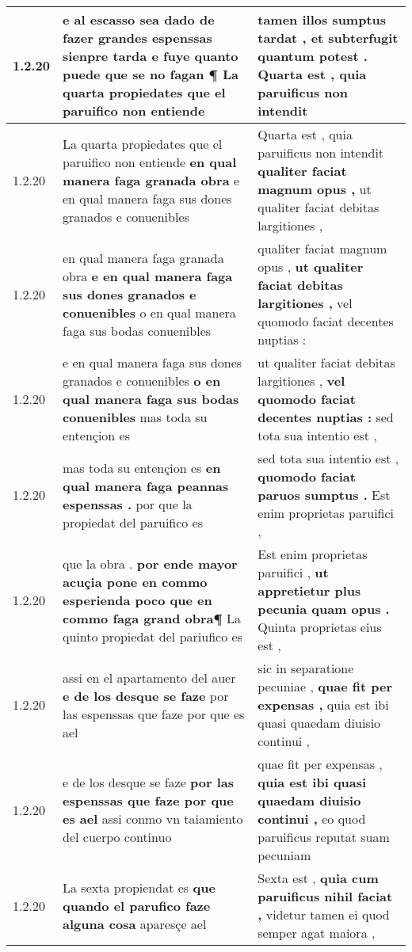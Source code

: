 \begin{tabular}{|p{1cm}|p{6.5cm}|p{6.5cm}|}
1.2.20 & e al escasso sea dado de fazer grandes espenssas sienpre tarda \textbf{ e fuye quanto puede que se no fagan ¶ } La quarta propiedates que el paruifico non entiende & tamen illos sumptus tardat , \textbf{ et subterfugit quantum potest . } Quarta est , quia paruificus non intendit \\\hline
1.2.20 & La quarta propiedates que el paruifico non entiende \textbf{ en qual manera faga granada obra } e en qual manera faga sus dones granados e conuenibles & Quarta est , quia paruificus non intendit \textbf{ qualiter faciat magnum opus , } ut qualiter faciat debitas largitiones , \\\hline
1.2.20 & en qual manera faga granada obra \textbf{ e en qual manera faga sus dones granados e conuenibles } o en qual manera faga sus bodas conuenibles & qualiter faciat magnum opus , \textbf{ ut qualiter faciat debitas largitiones , } vel quomodo faciat decentes nuptias : \\\hline
1.2.20 & e en qual manera faga sus dones granados e conuenibles \textbf{ o en qual manera faga sus bodas conuenibles } mas toda su entençion es & ut qualiter faciat debitas largitiones , \textbf{ vel quomodo faciat decentes nuptias : } sed tota sua intentio est , \\\hline
1.2.20 & mas toda su entençion es \textbf{ en qual manera faga peannas espenssas . } por que la propiedat del paruifico es & sed tota sua intentio est , \textbf{ quomodo faciat paruos sumptus . } Est enim proprietas paruifici , \\\hline
1.2.20 & que la obra . \textbf{ por ende mayor acuçia pone en commo esperienda poco que en commo faga grand obra¶ } La quinto propiedat del pariufico es & Est enim proprietas paruifici , \textbf{ ut appretietur plus pecunia quam opus . } Quinta proprietas eius est , \\\hline
1.2.20 & assi en el apartamento del auer \textbf{ e de los desque se faze } por las espenssas que faze por que es ael & sic in separatione pecuniae , \textbf{ quae fit per expensas , } quia est ibi quasi quaedam diuisio continui , \\\hline
1.2.20 & e de los desque se faze \textbf{ por las espenssas que faze por que es ael } assi conmo vn taiamiento del cuerpo continuo & quae fit per expensas , \textbf{ quia est ibi quasi quaedam diuisio continui , } eo quod paruificus reputat suam pecuniam \\\hline
1.2.20 & La sexta propiendat es \textbf{ que quando el parufico faze alguna cosa } aparesçe ael & Sexta est , \textbf{ quia cum paruificus nihil faciat , } videtur tamen ei quod semper agat maiora , \\\hline

\end{tabular}
